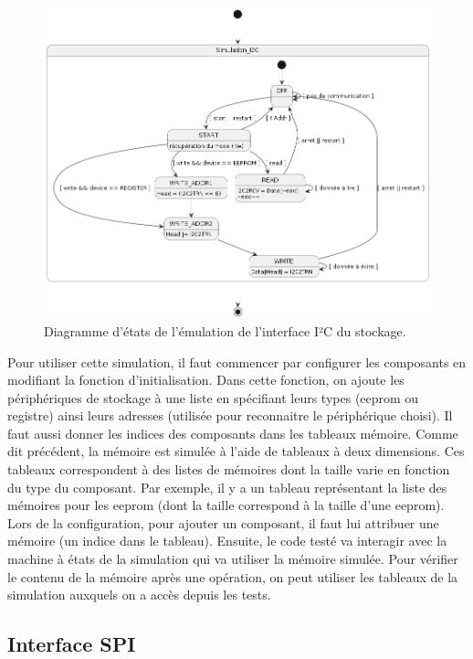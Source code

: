 \documentclass[a4paper]{article}
\begin{document}
\pagebreak
\begin{figure}[h!]
  \begin{center}
    \includegraphics[scale=0.5]{./graphs/sm-i2c.png}
    \caption{Diagramme d'états de l'émulation de l'interface I²C du stockage.}
    \label{fig:machineetatsi2c}
  \end{center}
\end{figure}

Pour utiliser cette simulation, il faut commencer par configurer les composants
en modifiant la fonction d'initialisation. Dans cette fonction, on ajoute les
périphériques de stockage à une liste en spécifiant leurs types (eeprom ou
registre) ainsi leurs adresses (utilisée pour reconnaitre le périphérique
choisi). Il faut aussi donner les indices des composants dans les tableaux
mémoire. Comme dit précédent, la mémoire est simulée à l'aide de tableaux à deux
dimensions. Ces tableaux correspondent à des listes de mémoires dont la taille
varie en fonction du type du composant. Par exemple, il y a un tableau
représentant la liste des mémoires pour les eeprom (dont la taille correspond à
la taille d'une eeprom). Lors de la configuration, pour ajouter un composant, il
faut lui attribuer une mémoire (un indice dans le tableau). Ensuite, le code
testé va interagir avec la machine à états de la simulation qui va utiliser la
mémoire simulée. Pour vérifier le contenu de la mémoire après une opération, on
peut utiliser les tableaux de la simulation auxquels on a accès depuis les
tests.
\subsection{Interface SPI}%
\end{document}
